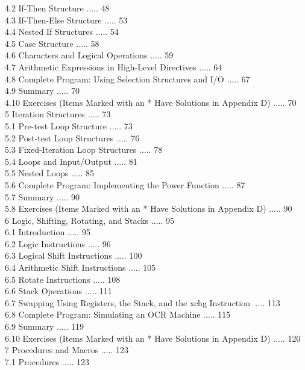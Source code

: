 \documentclass[10pt]{article}
\begin{document}
4.2 If-Then Structure ..... 48\\
4.3 If-Then-Else Structure ..... 53\\
4.4 Nested If Structures ..... 54\\
4.5 Case Structure ..... 58\\
4.6 Characters and Logical Operations ..... 59\\
4.7 Arithmetic Expressions in High-Level Directives ..... 64\\
4.8 Complete Program: Using Selection Structures and I/O ..... 67\\
4.9 Summary ..... 70\\
4.10 Exercises (Items Marked with an * Have Solutions in Appendix D) ..... 70\\
5 Iteration Structures ..... 73\\
5.1 Pre-test Loop Structure ..... 73\\
5.2 Post-test Loop Structures ..... 76\\
5.3 Fixed-Iteration Loop Structures ..... 78\\
5.4 Loops and Input/Output ..... 81\\
5.5 Nested Loops ..... 85\\
5.6 Complete Program: Implementing the Power Function ..... 87\\
5.7 Summary ..... 90\\
5.8 Exercises (Items Marked with an * Have Solutions in Appendix D) ..... 90\\
6 Logic, Shifting, Rotating, and Stacks ..... 95\\
6.1 Introduction ..... 95\\
6.2 Logic Instructions ..... 96\\
6.3 Logical Shift Instructions ..... 100\\
6.4 Arithmetic Shift Instructions ..... 105\\
6.5 Rotate Instructions ..... 108\\
6.6 Stack Operations ..... 111\\
6.7 Swapping Using Registers, the Stack, and the xchg Instruction ..... 113\\
6.8 Complete Program: Simulating an OCR Machine ..... 115\\
6.9 Summary ..... 119\\
6.10 Exercises (Items Marked with an * Have Solutions in Appendix D) ..... 120\\
7 Procedures and Macros ..... 123\\
7.1 Procedures ..... 123\\
\end{document}
